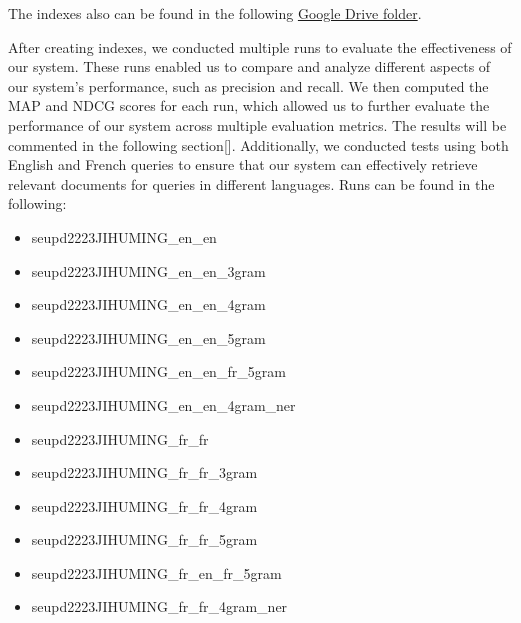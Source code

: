 The indexes also can be found in the following
\href{https://drive.google.com/drive/folders/1CK_kLeZ5Us3VJe8hiG1vhwPrDs94cLvU?usp=share_link}{Google Drive folder}.

After creating indexes, we conducted multiple runs to evaluate the effectiveness of our system. 
These runs enabled us to compare and analyze different aspects of our system's performance, such as precision and recall. 
We then computed the MAP and NDCG scores for each run, which allowed us to further evaluate the performance of our 
system across multiple evaluation metrics.
The results will be commented in the following section[].
Additionally, we conducted tests using both English and French queries to ensure that our system can effectively retrieve 
relevant documents for queries in different languages. 
Runs can be found in the following:
\begin{itemize}
	\item seupd2223\-JIHUMING\_en\_en
	\item seupd2223\-JIHUMING\_en\_en\_3gram
	\item seupd2223\-JIHUMING\_en\_en\_4gram
	\item seupd2223\-JIHUMING\_en\_en\_5gram
	\item seupd2223\-JIHUMING\_en\_en\_fr\_5gram
	\item seupd2223\-JIHUMING\_en\_en\_4gram\_ner
	\item seupd2223\-JIHUMING\_fr\_fr
	\item seupd2223\-JIHUMING\_fr\_fr\_3gram
	\item seupd2223\-JIHUMING\_fr\_fr\_4gram
	\item seupd2223\-JIHUMING\_fr\_fr\_5gram
	\item seupd2223\-JIHUMING\_fr\_en\_fr\_5gram
	\item seupd2223\-JIHUMING\_fr\_fr\_4gram\_ner
	
\end{itemize}